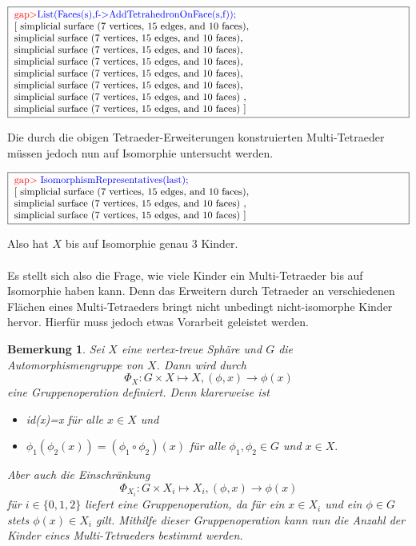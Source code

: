 \documentclass[12pt,titlepage,twoside,cleardoublepage]{article}
\theoremstyle{nummermitklammern}
\newtheorem{bemerkung}[temp]{Bemerkung}
\newtheorem{bemerkung}[zahl]{Bemerkung}
\numberwithin{equation}{section}
\begin{document}
\begin{center}
$\fbox{
\parbox{14cm}{
\textcolor{red}{gap$>$}\textcolor{blue}{ List(Faces(s),f-$>$AddTetrahedronOnFace(s,f));}\newline
[ simplicial surface (7 vertices, 15 edges, and 10 faces),\newline
simplicial surface (7 vertices, 15 edges, and 10 faces),\newline
 simplicial surface (7 vertices, 15 edges, and 10 faces),\newline
 simplicial surface (7 vertices, 15 edges, and 10 faces),\newline
 simplicial surface (7 vertices, 15 edges, and 10 faces),\newline
 simplicial surface (7 vertices, 15 edges, and 10 faces),\newline
  simplicial surface (7 vertices, 15 edges, and 10 faces)
    ,\newline
  simplicial surface (7 vertices, 15 edges, and 10 faces)
 ]
 }}$
 \end{center}
 Die durch die obigen Tetraeder-Erweiterungen konstruierten Multi-Tetraeder müssen jedoch nun auf Isomorphie untersucht werden.
 \begin{center} 
 $\fbox{
\parbox{14cm}{
\textcolor{red}{gap$>$} \textcolor{blue}{IsomorphismRepresentatives(last);}\newline
[ simplicial surface (7 vertices, 15 edges, and 10 faces),\newline
 simplicial surface (7 vertices, 15 edges, and 10 faces)
    ,
    \newline
  simplicial surface (7 vertices, 15 edges, and 10 faces)
 ]
}}$
\end{center}
Also hat $X$ bis auf Isomorphie genau 3 Kinder. \\\\
Es stellt sich also die Frage, wie viele Kinder ein Multi-Tetraeder bis auf Isomorphie haben kann. Denn das Erweitern durch Tetraeder an verschiedenen Flächen eines Multi-Tetraeders bringt nicht unbedingt nicht-isomorphe Kinder hervor. Hierfür muss jedoch etwas Vorarbeit geleistet werden.
\begin{bemerkung} 
Sei $X$ eine vertex-treue Sphäre und $G$ die Automorphismengruppe von $X$. Dann wird durch 
\[
\Phi_X:G \times X\mapsto X,(\phi, x)\to \phi(x)
\] eine Gruppenoperation definiert. Denn klarerweise ist
\begin{itemize}
\item id(x)=x für alle $x\in X$ und
\item $\phi_1(\phi_2 (x))=(\phi_1 \circ\phi_2)(x)$ für alle $\phi_1,\phi_2 \in G$ und $x\in X.$
\end{itemize}
Aber auch die Einschränkung   
\[
\Phi_{X_i}:G \times X_i\mapsto X_i,(\phi, x)\to \phi(x)
\] für $i\in \{0,1,2\}$ liefert eine Gruppenoperation, da für ein $x\in X_i$ und ein $\phi\in G$ stets $\phi(x)\in X_i$ gilt. Mithilfe dieser Gruppenoperation kann nun die Anzahl der Kinder eines Multi-Tetraeders bestimmt werden.
\end{bemerkung}
\end{document}
